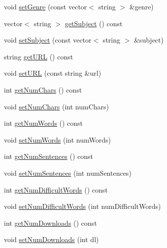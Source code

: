 \begin{DoxyCompactItemize}
void \mbox{\hyperlink{classbridges_1_1_gutenberg_book_a9536f2e24248b4ebd78ea4aac209a1af}{set\+Genre}} (const vector$<$ string $>$ \&genre)
\item 
vector$<$ string $>$ \mbox{\hyperlink{classbridges_1_1_gutenberg_book_a712e14c88ad1e22bcddf2c375de179f2}{get\+Subject}} () const
\item 
void \mbox{\hyperlink{classbridges_1_1_gutenberg_book_a705486531e78750c1b8fb6c5bba59f8c}{set\+Subject}} (const vector$<$ string $>$ \&subject)
\item 
string \mbox{\hyperlink{classbridges_1_1_gutenberg_book_a71bf334038edbacbe429a5f0b199f13e}{get\+U\+RL}} () const
\item 
void \mbox{\hyperlink{classbridges_1_1_gutenberg_book_aa60ee0598e6726611f1b4fe6cdb53748}{set\+U\+RL}} (const string \&url)
\item 
int \mbox{\hyperlink{classbridges_1_1_gutenberg_book_a5ca19cb4fa9a56839a181df9868dd9a8}{get\+Num\+Chars}} () const
\item 
void \mbox{\hyperlink{classbridges_1_1_gutenberg_book_a65cb7af6360e56a684e0606593846780}{set\+Num\+Chars}} (int num\+Chars)
\item 
int \mbox{\hyperlink{classbridges_1_1_gutenberg_book_acf92a1268a82a432b7dffbdc417d5480}{get\+Num\+Words}} () const
\item 
void \mbox{\hyperlink{classbridges_1_1_gutenberg_book_a34dafee1fb976f1da102d40f33a08ecf}{set\+Num\+Words}} (int num\+Words)
\item 
int \mbox{\hyperlink{classbridges_1_1_gutenberg_book_ab4051fb04c3cfa2ffca41923ace38f2f}{get\+Num\+Sentences}} () const
\item 
void \mbox{\hyperlink{classbridges_1_1_gutenberg_book_a368e71eaea48375104f172e0ae17527d}{set\+Num\+Sentences}} (int num\+Sentences)
\item 
int \mbox{\hyperlink{classbridges_1_1_gutenberg_book_a17267c230a8ebbf2040652bea5db880e}{get\+Num\+Difficult\+Words}} () const
\item 
void \mbox{\hyperlink{classbridges_1_1_gutenberg_book_a4397cd3b9fd6113a1e72eb7671dd9d87}{set\+Num\+Difficult\+Words}} (int num\+Difficult\+Words)
\item 
int \mbox{\hyperlink{classbridges_1_1_gutenberg_book_ae7386527b0e2994db571dd7fec21f004}{get\+Num\+Downloads}} () const
\item 
void \mbox{\hyperlink{classbridges_1_1_gutenberg_book_a6846dba9a5a78f360a0483b8685d79c1}{set\+Num\+Downloads}} (int dl)
\end{DoxyCompactItemize}


